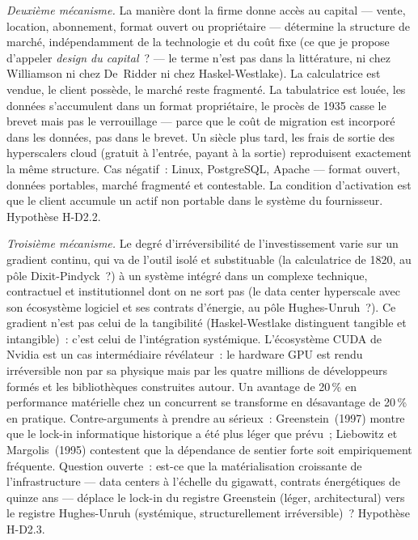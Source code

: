 \emph{Deuxième mécanisme.} La manière dont la firme donne accès au capital --- vente, location, abonnement, format ouvert ou propriétaire --- détermine la structure de marché, indépendamment de la technologie et du coût fixe (ce que je propose d'appeler \emph{design du capital}~? --- le terme n'est pas dans la littérature, ni chez Williamson ni chez De~Ridder ni chez Haskel-Westlake). La calculatrice est vendue, le client possède, le marché reste fragmenté. La tabulatrice est louée, les données s'accumulent dans un format propriétaire, le procès de 1935 casse le brevet mais pas le verrouillage --- parce que le coût de migration est incorporé dans les données, pas dans le brevet. Un siècle plus tard, les frais de sortie des hyperscalers cloud (gratuit à l'entrée, payant à la sortie) reproduisent exactement la même structure. Cas négatif~: Linux, PostgreSQL, Apache --- format ouvert, données portables, marché fragmenté et contestable. La condition d'activation est que le client accumule un actif non portable dans le système du fournisseur. Hypothèse H-D2.2.

\emph{Troisième mécanisme.} Le degré d'irréversibilité de l'investissement varie sur un gradient continu, qui va de l'outil isolé et substituable (la calculatrice de 1820, au pôle Dixit-Pindyck~?) à un système intégré dans un complexe technique, contractuel et institutionnel dont on ne sort pas (le data center hyperscale avec son écosystème logiciel et ses contrats d'énergie, au pôle Hughes-Unruh~?). Ce gradient n'est pas celui de la tangibilité (Haskel-Westlake distinguent tangible et intangible)~: c'est celui de l'intégration systémique. L'écosystème CUDA de Nvidia est un cas intermédiaire révélateur~: le hardware GPU est rendu irréversible non par sa physique mais par les quatre millions de développeurs formés et les bibliothèques construites autour. Un avantage de 20\,\% en performance matérielle chez un concurrent se transforme en désavantage de 20\,\% en pratique. Contre-arguments à prendre au sérieux~: Greenstein~(1997) montre que le lock-in informatique historique a été plus léger que prévu~; Liebowitz et Margolis~(1995) contestent que la dépendance de sentier forte soit empiriquement fréquente. Question ouverte~: est-ce que la matérialisation croissante de l'infrastructure --- data centers à l'échelle du gigawatt, contrats énergétiques de quinze ans --- déplace le lock-in du registre Greenstein (léger, architectural) vers le registre Hughes-Unruh (systémique, structurellement irréversible)~? Hypothèse H-D2.3.



